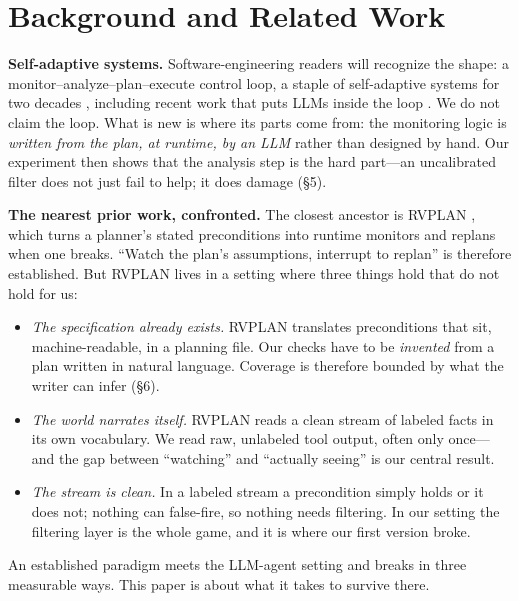\documentclass[acmsmall,screen]{acmart}
\begin{document}
\section{Background and Related Work}
\textbf{Self-adaptive systems.} Software-engineering readers will recognize the
shape: a monitor--analyze--plan--execute control loop, a staple of
self-adaptive systems for two decades \cite{ref23, ref24}, including recent work
that puts LLMs inside the loop \cite{ref25, ref26}. We do not claim the loop.
What is new is where its parts come from: the monitoring logic is \emph{written
from the plan, at runtime, by an LLM} rather than designed by hand. Our
experiment then shows that the analysis step is the hard part---an uncalibrated
filter does not just fail to help; it does damage (\S5).

\textbf{The nearest prior work, confronted.} The closest ancestor is RVPLAN
\cite{ref6, ref34}, which turns a planner's stated preconditions into runtime
monitors and replans when one breaks. ``Watch the plan's assumptions, interrupt
to replan'' is therefore established. But RVPLAN lives in a setting where three
things hold that do not hold for us:

\begin{itemize}
  \item \emph{The specification already exists.} RVPLAN translates
  preconditions that sit, machine-readable, in a planning file. Our checks have
  to be \emph{invented} from a plan written in natural language. Coverage is
  therefore bounded by what the writer can infer (\S6).
  \item \emph{The world narrates itself.} RVPLAN reads a clean stream of
  labeled facts in its own vocabulary. We read raw, unlabeled tool output,
  often only once---and the gap between ``watching'' and ``actually seeing'' is
  our central result.
  \item \emph{The stream is clean.} In a labeled stream a precondition simply
  holds or it does not; nothing can false-fire, so nothing needs filtering. In
  our setting the filtering layer is the whole game, and it is where our first
  version broke.
\end{itemize}

An established paradigm meets the LLM-agent setting and breaks in three
measurable ways. This paper is about what it takes to survive there.
\end{document}

